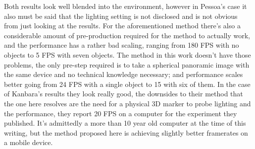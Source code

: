 Both results look well blended into the environment, however in Pessoa's case it also must be said that the lighting setting is not disclosed and is not obvious from just looking at the results. For the aforementioned method there's also a considerable amount of pre-production required for the method to actually work, and the performance has a rather bad scaling, ranging from 180 FPS with no objects to 5 FPS with seven objects. The method in this work doesn't have those problems, the only pre-step required is to take a spherical panoramic image with the same device and no technical knowledge necessary;  and performance scales better going from 24 FPS with a single object to 15 with six of them.\newline
In the case of Kanbara's results they look really good, the downsides to their method that the one here resolves are the need for a physical 3D marker to probe lighting and the performance, they report 20 FPS on a computer for the experiment they published. It's admittedly a more than 10 year old computer at the time of this writing, but the method proposed here is achieving slightly better framerates on a mobile device.\newline

